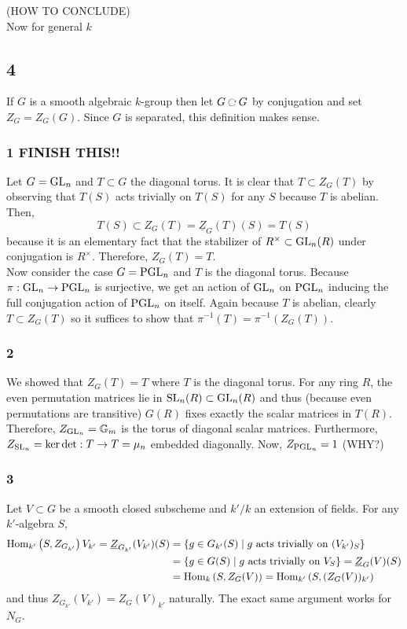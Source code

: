 \documentclass[12pt]{article}
\begin{document}
(HOW TO CONCLUDE)
\bigskip\\
Now for general $k$

\subsection{4}

If $G$ is a smooth algebraic $k$-group then let $G \acts G$ by conjugation and set $Z_G = Z_G(G)$. Since $G$ is separated, this definition makes sense.

\subsubsection{1 FINISH THIS!!}

Let $G = \mathrm{GL}_n$ and $T \subset G$ the diagonal torus. It is clear that $T \subset Z_G(T)$ by observing that $T(S)$ acts trivially on $T(S)$ for any $S$ because $T$ is abelian. Then, 
\[ T(S) \subset Z_G(T) = \underline{Z}_G(T)(S) = T(S) \]
because it is an elementary fact that the stabilizer of $R^\times \subset \mathrm{GL}_n(R)$ under conjugation is $R^\times$. Therefore, $Z_G(T) = T$.
\bigskip\\
Now consider the case $G = \mathrm{PGL}_n$ and $T$ is the diagonal torus. Because $\pi : \mathrm{GL}_n \to \mathrm{PGL}_n$ is surjective, we get an action of $\mathrm{GL}_n$ on $\mathrm{PGL}_n$ inducing the full conjugation action of $\mathrm{PGL}_n$ on itself. Again because $T$ is abelian, clearly $T \subset Z_G(T)$ so it suffices to show that $\pi^{-1}(T) = \pi^{-1}(Z_G(T))$. 
 
\subsubsection{2}

We showed that $Z_G(T) = T$ where $T$ is the diagonal torus. For any ring $R$, the even permutation matrices lie in $\mathrm{SL}_n(R) \subset \mathrm{GL}_n(R)$ and thus (because even permutations are transitive) $G(R)$ fixes exactly the scalar matrices in $T(R)$. Therefore, $Z_{\mathrm{GL}_n} = \mathbb{G}_m$ is the torus of diagonal scalar matrices. Furthermore, $Z_{\mathrm{SL}_n} = \ker{\det : T \to T} = \mu_n$ embedded diagonally. Now, $Z_{\mathrm{PGL}_n} = 1$ (WHY?)

\subsubsection{3}

Let $V \subset G$ be a smooth closed subscheme and $k'/k$ an extension of fields. For any $k'$-algebra $S$,
\begin{align*}
\mathrm{Hom}_{k'} \left( S, Z_{G_{k'}} \right){V_{k'}} = \underline{Z}_{G_{k'}}(V_{k'})(S) & = \{ g \in G_{k'}(S) \mid g \text{ acts trivially on } (V_{k'})_{S} \} 
\\
& = \{ g \in G(S) \mid g \text{ acts trivially on } V_{S} \}  = \underline{Z}_{G}(V)(S) 
\\
& = \mathrm{Hom}_{k} \left( S, Z_G(V) \right) = \mathrm{Hom}_{k'} \left( S, (Z_G(V))_{k'} \right) 
\end{align*}
and thus $Z_{G_{k'}}(V_{k'}) = Z_G(V)_{k'}$ naturally. The exact same argument works for $N_G$.
\end{document}
